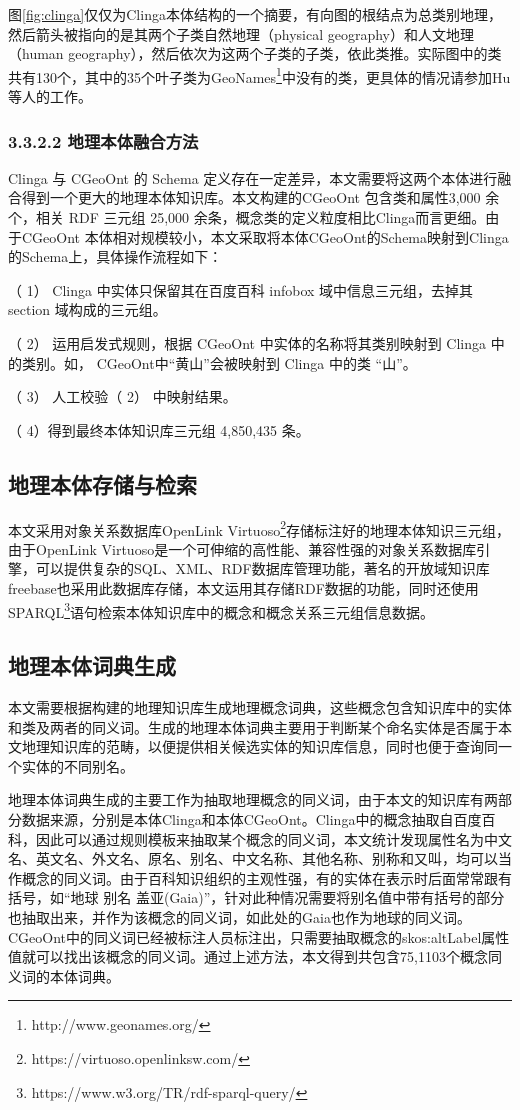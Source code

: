图\ref{fig:clinga}仅仅为Clinga本体结构的一个摘要，有向图的根结点为总类别地理，然后箭头被指向的是其两个子类自然地理（physical geography）和人文地理（human geography），然后依次为这两个子类的子类，依此类推。实际图中的类共有130个，其中的35个叶子类为GeoNames\footnote{http://www.geonames.org/}中没有的类，更具体的情况请参加Hu\cite{Hu}等人的工作。

\subsubsection{3.3.2.2 地理本体融合方法}
Clinga 与 CGeoOnt 的 Schema 定义存在一定差异，本文需要将这两个本体进行融合得到一个更大的地理本体知识库。本文构建的CGeoOnt 包含类和属性3,000 余个，相关 RDF 三元组 25,000 余条，概念类的定义粒度相比Clinga而言更细。由于CGeoOnt 本体相对规模较小，本文采取将本体CGeoOnt的Schema映射到Clinga的Schema上，具体操作流程如下：

（ 1） Clinga 中实体只保留其在百度百科 infobox 域中信息三元组，去掉其 section 域构成的三元组。

（ 2） 运用启发式规则，根据 CGeoOnt 中实体的名称将其类别映射到 Clinga 中的类别。如， CGeoOnt中“黄山”会被映射到 Clinga 中的类 “山”。

（ 3） 人工校验（ 2） 中映射结果。

（ 4）得到最终本体知识库三元组 4,850,435 条。

\subsection{地理本体存储与检索}

本文采用对象关系数据库OpenLink Virtuoso\footnote{https://virtuoso.openlinksw.com/}存储标注好的地理本体知识三元组，由于OpenLink Virtuoso是一个可伸缩的高性能、兼容性强的对象关系数据库引擎，可以提供复杂的SQL、XML、RDF数据库管理功能，著名的开放域知识库freebase也采用此数据库存储，本文运用其存储RDF数据的功能，同时还使用SPARQL\footnote{https://www.w3.org/TR/rdf-sparql-query/}语句检索本体知识库中的概念和概念关系三元组信息数据。

\subsection{地理本体词典生成}
本文需要根据构建的地理知识库生成地理概念词典，这些概念包含知识库中的实体和类及两者的同义词。生成的地理本体词典主要用于判断某个命名实体是否属于本文地理知识库的范畴，以便提供相关候选实体的知识库信息，同时也便于查询同一个实体的不同别名。

地理本体词典生成的主要工作为抽取地理概念的同义词，由于本文的知识库有两部分数据来源，分别是本体Clinga和本体CGeoOnt。Clinga中的概念抽取自百度百科，因此可以通过规则模板来抽取某个概念的同义词，本文统计发现属性名为中文名、英文名、外文名、原名、别名、中文名称、其他名称、别称和又叫，均可以当作概念的同义词。由于百科知识组织的主观性强，有的实体在表示时后面常常跟有括号，如“地球 别名 盖亚(Gaia)”，针对此种情况需要将别名值中带有括号的部分也抽取出来，并作为该概念的同义词，如此处的Gaia也作为地球的同义词。CGeoOnt中的同义词已经被标注人员标注出，只需要抽取概念的skos:altLabel属性值就可以找出该概念的同义词。通过上述方法，本文得到共包含75,1103个概念同义词的本体词典。

